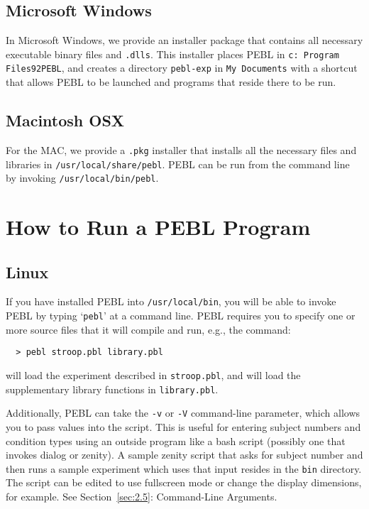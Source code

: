 \subsection{Microsoft Windows}

In Microsoft Windows, we provide an installer package that contains
all necessary executable binary files and \texttt{.dlls}. This
installer places PEBL in \texttt{c: Program Files\char92PEBL},
and creates a directory \texttt{pebl-exp} in \texttt{My Documents}
with a shortcut that allows PEBL to be launched and programs that
reside there to be run.

\subsection{Macintosh OSX}

For the MAC, we provide a \texttt{.pkg} installer that installs all the
necessary files and libraries in \texttt{/usr/local/share/pebl}.  PEBL can be
run from the command line by invoking \texttt{/usr/local/bin/pebl}.


\section{How to Run a PEBL Program}


\subsection{Linux}

If you have installed PEBL into \texttt{/usr/local/bin}, you will be able to
invoke PEBL by typing `\texttt{pebl}' at a command line.  PEBL requires you to
specify one or more source files that it will compile and run, e.g., the
command:
\begin{verbatim}
  > pebl stroop.pbl library.pbl
\end{verbatim}
will load the experiment described in \texttt{stroop.pbl}, and will load the
supplementary library functions in \texttt{library.pbl}.

Additionally, PEBL can take the \texttt{-v} or \texttt{-V} command-line parameter, which allows you to pass values into the script.  This is useful for
entering subject numbers and condition types using an outside program
like a bash script (possibly one that invokes dialog or zenity). A sample zenity script that asks for subject number and then runs a sample experiment which uses that input resides in the \texttt{bin} directory. The script can be edited to use fullscreen mode or change the display dimensions, for example. See Section~\ref{sec:2.5}: Command-Line Arguments.

